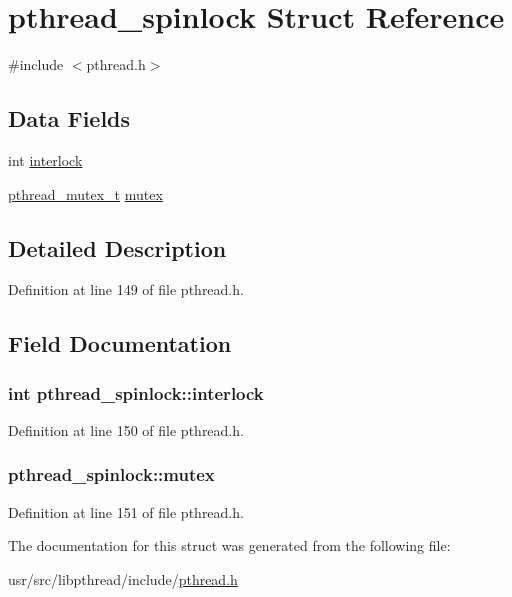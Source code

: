 \hypertarget{structpthread__spinlock}{\section{pthread\+\_\+spinlock Struct Reference}
\label{structpthread__spinlock}
}


{\ttfamily \#include $<$pthread.\+h$>$}

\subsection*{Data Fields}
\begin{DoxyCompactItemize}
\item 
int \hyperlink{structpthread__spinlock_a7b8aa3d5e657c6e399aa7a94c8c6d4fe}{interlock}
\item 
\hyperlink{pthread_8h_ad613e9ad2d8d9713a8440618e7a70bba}{pthread\+\_\+mutex\+\_\+t} \hyperlink{structpthread__spinlock_aebd79085a40b0d251d747a24f77746f5}{mutex}
\end{DoxyCompactItemize}


\subsection{Detailed Description}


Definition at line 149 of file pthread.\+h.



\subsection{Field Documentation}
\hypertarget{structpthread__spinlock_a7b8aa3d5e657c6e399aa7a94c8c6d4fe}{
\subsubsection[{interlock}]{\setlength{\rightskip}{0pt plus 5cm}int pthread\+\_\+spinlock\+::interlock}}\label{structpthread__spinlock_a7b8aa3d5e657c6e399aa7a94c8c6d4fe}


Definition at line 150 of file pthread.\+h.

\hypertarget{structpthread__spinlock_aebd79085a40b0d251d747a24f77746f5}{
\subsubsection[{mutex}]{ pthread\+\_\+spinlock\+::mutex}}\label{structpthread__spinlock_aebd79085a40b0d251d747a24f77746f5}


Definition at line 151 of file pthread.\+h.



The documentation for this struct was generated from the following file\+:\begin{DoxyCompactItemize}
\item 
usr/src/libpthread/include/\hyperlink{pthread_8h}{pthread.\+h}\end{DoxyCompactItemize}
